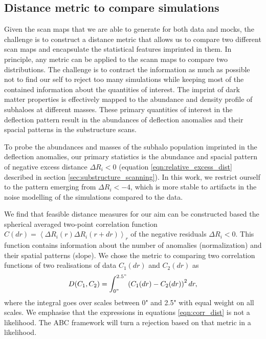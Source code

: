 \documentclass[a4paper,11pt]{article}
\begin{document}
\subsection{Distance metric to compare simulations}\label{sec:model_comparison_sub}

Given the scan maps that we are able to generate for both data and mocks, the challenge is to construct a distance metric that allows us to compare two different scan maps and encapsulate the statistical features imprinted in them. In principle, any metric can be applied to the scann maps to compare two distributions. The challenge is to contract the information as much as possible not to find our self to reject too many simulations while keeping most of the contained information about the quantities of interest. The imprint of dark matter properties is effectively mapped to the abundance and density profile of subhaloes at different masses. These primary quantities of interest in the deflection pattern result in the abundances of deflection anomalies and their spacial patterns in the substructure scans. 

To probe the abundances and masses of the subhalo population imprinted in the deflection anomalies, our primary statistics is the abundance and spacial pattern of negative excess distance $\Delta R_i < 0$ (equation \ref{eqn:relative_excess_dist} described in section \ref{sec:substructure_scanning}). In this work, we restrict ourself to the pattern emerging from $\Delta R_i < -4$, which is more stable to artifacts in the noise modelling of the simulations compared to the data.


We find that feasible distance measures for our aim can be constructed based the spherical averaged two-point correlation function $C(dr) = \left<\Delta R_i(r)\Delta R_i(r+dr)\right>_{r}$ of the negative residuals $\Delta R_i < 0$. This function contains information about the number of anomalies (normalization) and their spatial patterns (slope). We chose the metric to comparing two correlation functions of two realisations of data $C_1(dr)$ and $C_2(dr)$ as
\begin{equation} \label{eqn:corr_dist}
	D(C_1, C_2) = \int_{0"}^{2.5"} \left(C_1(dr) - C_2(dr)\right)^2dr,
\end{equation} 
where the integral goes over scales between 0" and 2.5" with equal weight on all scales.
We emphasise that the expressions in equations \ref{eqn:corr_dist} is not a likelihood. The ABC framework will turn a rejection based on that metric in a likelihood.
\end{document}
